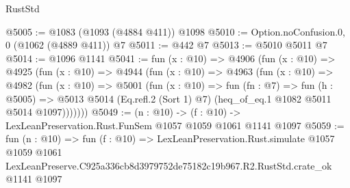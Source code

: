 \begin{lexlean}{RustStd}
\begin{coremodule}
@5005 := @1083 (@1093 (@4884 @411)) @1098
@5010 := Option.noConfusion.{0, 0} (@1062 (@4889 @411)) @7
@5011 := @442 @7
@5013 := @5010 @5011 @7
@5014 := @1096 @1141
@5041 := fun (x : @10) =>
  @4906
    (fun (x : @10) =>
    @4925
      (fun (x : @10) =>
      @4944
        (fun (x : @10) =>
        @4963
          (fun (x : @10) =>
          @4982
            (fun (x : @10) =>
            @5001
              (fun (x : @10) =>
              fun (fn : @7) =>
              fun (h : @5005) =>
              @5013 @5014 (Eq.refl.{2} (Sort 1) @7) (heq_of_eq.{1} @1082 @5011 @5014 @1097)))))))
@5049 := (n : @10) -> (f : @10) -> LexLeanPreservation.Rust.FunSem @1057 @1059 @1061 @1141 @1097
@5059 := fun (n : @10) =>
  fun (f : @10) =>
  LexLeanPreservation.Rust.simulate
    @1057
    @1059
    @1061
    LexLeanPreserve.C925a336cb8d3979752de75182c19b967.R2.RustStd.crate_ok
    @1141
    @1097
\end{coremodule}
\end{lexlean}
